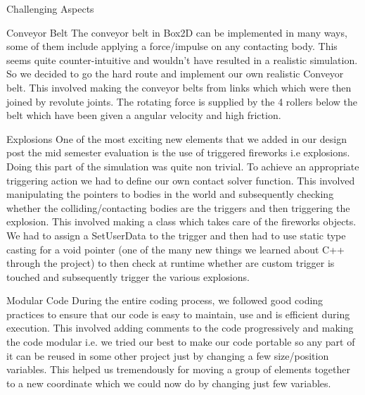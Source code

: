\documentclass[a4paper,12pt]{article}
\begin{document}
\begin{section}{Challenging Aspects}
\begin{subsection}{Conveyor Belt}
The conveyor belt in Box2D can be implemented in many ways, some of them include applying a force/impulse on any contacting body. This seems quite counter-intuitive and wouldn’t have resulted in a realistic simulation.
\linebreak
\linebreak
So we decided to go the hard route and implement our own realistic Conveyor belt. This involved making the conveyor belts from links which which were then joined by revolute joints. The rotating force is supplied by the 4 rollers below the belt which have been given a angular velocity and high friction.
\end{subsection}
\begin{subsection}{Explosions} One of the most exciting new elements that we added in our design post the mid semester evaluation is the use of triggered fireworks i.e explosions. Doing this part of the simulation was quite non trivial. 
\linebreak
\linebreak
To achieve an appropriate triggering action we had to define our own contact solver function. This involved manipulating the pointers to bodies in the world and subsequently checking whether the colliding/contacting bodies are the triggers and then triggering the explosion. This involved making a class which takes care of the fireworks objects. 
\linebreak
\linebreak
We had to assign a SetUserData to the trigger and then had to use static type casting for a void pointer (one of the many new things we learned about C++ through the project) to then check at runtime whether are custom trigger is touched and subsequently trigger the various explosions.
\end{subsection}
\begin{subsection}{Modular Code}
During the entire coding process, we followed good coding practices to ensure that our code is easy to maintain, use and is efficient during execution. This involved adding comments to the code progressively and making the code modular i.e. we tried our best to make our code portable so any part of it can be reused in some other project just by changing a few size/position variables. 
\linebreak
\linebreak
This helped us tremendously for moving a group of elements together to a new coordinate which we could now do by changing just few variables. 

\end{subsection}
\end{section}
\end{document}
